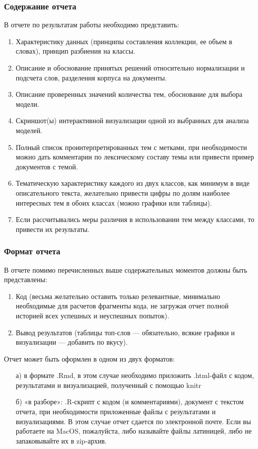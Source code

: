 \documentclass{report}
\begin{document}
\subsubsection{Содержание отчета}

В отчете по результатам работы необходимо представить: 

\begin{enumerate}
\item Характеристику данных (принципы составления коллекции, ее объем
  в словах), принцип разбиения на классы.
\item Описание и обоснование принятых решений относительно
  нормализации и подсчета слов, разделения корпуса на документы. 
\item Описание проверенных значений количества тем, обоснование для
  выбора модели. 
\item Скриншот(ы) интерактивной визуализации одной из выбранных для
  анализа моделей. 
\item Полный список проинтерпретированных тем с метками, при
  необходимости можно дать комментарии по лексическому составу темы
  или привести пример документов с темой.
\item Тематическую характеристику каждого из двух классов, как минимум
  в виде описательного текста, желательно привести цифры по долям
  наиболее интересных тем в обоих классах (можно графики или
  таблицы). 
\item Если рассчитывались меры различия в использовании тем между
  классами, то привести их результаты.
\end{enumerate}

\subsubsection{Формат отчета}

В отчете помимо перечисленных выше содержательных моментов должны быть
представлены:

\begin{enumerate}
\item Код (весьма желательно оставить только релевантные, минимально
  необходимые для расчетов фрагменты кода, не загружая отчет полной
  историей всех успешных и неуспешных попыток).
\item Вывод результатов (таблицы топ-слов — обязательно, всякие
  графики и визуализации — добавить по вкусу).
\end{enumerate}

Отчет может быть оформлен в одном из двух форматов:
\begin{itemize}
\item[а)] в формате .Rmd, в этом случае необходимо приложить
  .html-файл с кодом, результатами и визуализацией, полученный с
  помощью knitr
\item[б)] «в разборе»: .R-скрипт с кодом (и комментариями), документ с
  текстом отчета, при необходимости приложенные файлы с результатами и
  визуализациями. В этом случае отчет сдается по электронной
  почте. Если вы работаете на MacOS, пожалуйста, либо называйте файлы
  латиницей, либо не запаковывайте их в zip-архив.
\end{itemize}
\end{document}
